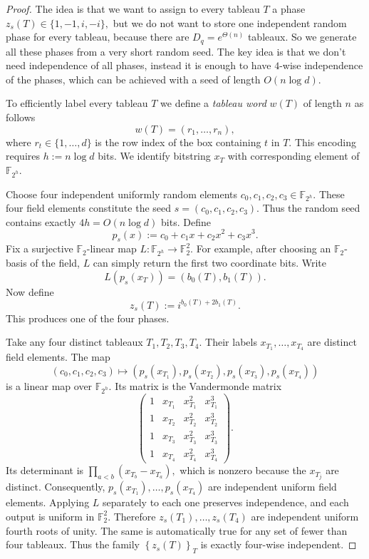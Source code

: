 \documentclass[11pt,letterpaper]{article}
\theoremstyle{plain}
\theoremstyle{plain}
\theoremstyle{plain}
\theoremstyle{plain}
\theoremstyle{plain}
\theoremstyle{plain}
\theoremstyle{plain}
\theoremstyle{definition}
\theoremstyle{plain}
\begin{document}
\begin{proof}
The idea is that we want to assign to every tableau $T$ a phase
$
z_s(T) \in\{1,-1, i,-i\},
$
but we do not want to store one independent random phase for every tableau, because there are
$
D_q=e^{\Theta(n)}
$
tableaux. So we generate all these phases from a very short random seed. The key idea is that we don't need independence of all phases, 
instead it is enough to have $4$-wise independence of the phases, which can be achieved with a seed of length $O(n \log d)$.

To efficiently label every tableau $T$ we define a \textit{tableau word} $w(T)$ of length $n$ as follows
\[
    w(T)=\left(r_1, \ldots, r_n\right),
\]
where $r_t\in\{1, \ldots, d\}$ is the row index of the box containing $t$ in $T$. This encoding requires $h:=n \log d$ bits.
We identify bitstring $x_T$ with corresponding element of $\mathbb{F}_{2^h}$.

Choose four independent uniformly random elements
$
c_0, c_1, c_2, c_3 \in \mathbb{F}_{2^h} .
$
These four field elements constitute the seed
$
s=\left(c_0, c_1, c_2, c_3\right) .
$
Thus the random seed contains exactly
$
4 h=O(n \log d)
$
bits.
Define
$$
p_s(x):=c_0+c_1 x+c_2 x^2+c_3 x^3 .
$$
Fix a surjective $\mathbb{F}_2$-linear map
$
L: \mathbb{F}_{2^h} \longrightarrow \mathbb{F}_2^2 .
$
For example, after choosing an $\mathbb{F}_2$-basis of the field, $L$ can simply return the first two coordinate bits.
Write
$$
L\left(p_s\left(x_T\right)\right)=\left(b_0(T), b_1(T)\right) .
$$
Now define
$$
z_s(T):=i^{b_0(T)+2 b_1(T)} .
$$
This produces one of the four phases. 

Take any four distinct tableaux
$
T_1, T_2, T_3, T_4 .
$
Their labels
$
x_{T_1}, \ldots, x_{T_4}
$
are distinct field elements.
The map
$$
\left(c_0, c_1, c_2, c_3\right) \longmapsto\left(p_s\left(x_{T_1}\right), p_s\left(x_{T_2}\right), p_s\left(x_{T_3}\right), p_s\left(x_{T_4}\right)\right)
$$
is a linear map over $\mathbb{F}_{2^h}$. Its matrix is the Vandermonde matrix
$$
\left(\begin{array}{cccc}
1 & x_{T_1} & x_{T_1}^2 & x_{T_1}^3 \\
1 & x_{T_2} & x_{T_2}^2 & x_{T_2}^3 \\
1 & x_{T_3} & x_{T_3}^2 & x_{T_3}^3 \\
1 & x_{T_4} & x_{T_4}^2 & x_{T_4}^3
\end{array}\right) .
$$
Its determinant is
$
\prod_{a<b}\left(x_{T_b}-x_{T_a}\right),
$
which is nonzero because the $x_{T_j}$ are distinct.
Consequently,
$
p_s\left(x_{T_1}\right), \ldots, p_s\left(x_{T_4}\right)
$
are independent uniform field elements.
Applying $L$ separately to each one preserves independence, and each output is uniform in $\mathbb{F}_2^2$. Therefore
$
z_s\left(T_1\right), \ldots, z_s\left(T_4\right)
$
are independent uniform fourth roots of unity.
The same is automatically true for any set of fewer than four tableaux.
Thus the family
$
\left\{z_s(T)\right\}_T
$
is exactly four-wise independent.


\end{proof}
\end{document}

